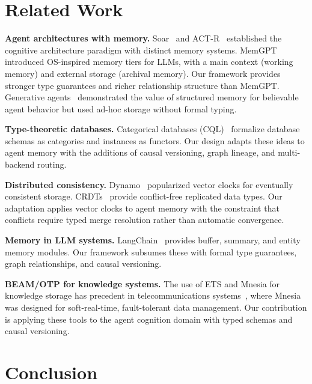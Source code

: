 \documentclass[12pt,a4paper]{article}
\theoremstyle{definition}
\begin{document}
\section{Related Work}\label{sec:related}

\textbf{Agent architectures with memory.}
Soar~\citep{laird2012soar} and ACT-R~\citep{anderson2004actr} established the cognitive architecture paradigm with distinct memory systems.
MemGPT~\citep{packer2023memgpt} introduced OS-inspired memory tiers for LLMs, with a main context (working memory) and external storage (archival memory).
Our framework provides stronger type guarantees and richer relationship structure than MemGPT.
Generative agents~\citep{park2023generative} demonstrated the value of structured memory for believable agent behavior but used ad-hoc storage without formal typing.

\textbf{Type-theoretic databases.}
Categorical databases (CQL)~\citep{spivak2014category, schultz2017algebraic} formalize database schemas as categories and instances as functors.
Our design adapts these ideas to agent memory with the additions of causal versioning, graph lineage, and multi-backend routing.

\textbf{Distributed consistency.}
Dynamo~\citep{decandia2007dynamo} popularized vector clocks for eventually consistent storage.
CRDTs~\citep{shapiro2011crdt} provide conflict-free replicated data types.
Our adaptation applies vector clocks to agent memory with the constraint that conflicts require typed merge resolution rather than automatic convergence.

\textbf{Memory in LLM systems.}
LangChain~\citep{langchain2023} provides buffer, summary, and entity memory modules.
Our framework subsumes these with formal type guarantees, graph relationships, and causal versioning.

\textbf{BEAM/OTP for knowledge systems.}
The use of ETS and Mnesia for knowledge storage has precedent in telecommunications systems~\citep{mattsson1999mnesia, virding1996erlang}, where Mnesia was designed for soft-real-time, fault-tolerant data management.
Our contribution is applying these tools to the agent cognition domain with typed schemas and causal versioning.

\section{Conclusion}\label{sec:conclusion}
\end{document}
